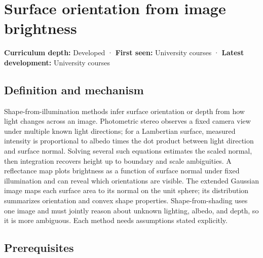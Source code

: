 \hypertarget{appendix-89b2d5b7c9e1}{}\label{referencestart:appendix-89b2d5b7c9e1}
\section{Surface orientation from image brightness}\label{appendix-89b2d5b7c9e1-surface-orientation-from-image-brightness}

\hypertarget{appendix-89b2d5b7c9e1-surface-orientation-from-image-brightness}{}

\textbf{Curriculum depth:} Developed · \textbf{First seen:} University courses · \textbf{Latest development:} University courses

\begin{allmightroledefinition}

\subsection{Definition and mechanism}\label{appendix-89b2d5b7c9e1-definition-and-mechanism}

\hypertarget{appendix-89b2d5b7c9e1-definition-and-mechanism}{}

Shape-from-illumination methods infer surface orientation or depth from how light changes across an image. Photometric stereo observes a fixed camera view under multiple known light directions; for a Lambertian surface, measured intensity is proportional to albedo times the dot product between light direction and surface normal. Solving several such equations estimates the scaled normal, then integration recovers height up to boundary and scale ambiguities. A reflectance map plots brightness as a function of surface normal under fixed illumination and can reveal which orientations are visible. The extended Gaussian image maps each surface area to its normal on the unit sphere; its distribution summarizes orientation and convex shape properties. Shape-from-shading uses one image and must jointly reason about unknown lighting, albedo, and depth, so it is more ambiguous. Each method needs assumptions stated explicitly.

\end{allmightroledefinition}

\subsection{Prerequisites}\label{appendix-89b2d5b7c9e1-prerequisites}

\hypertarget{appendix-89b2d5b7c9e1-prerequisites}{}

